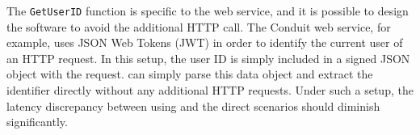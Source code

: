 The \lstinline{GetUserID} function is specific to the web service, and it is possible to design the software to avoid the additional HTTP call. The Conduit web service, for example, uses JSON Web Tokens (JWT) in order to identify the current user of an HTTP request. In this setup, the user ID is simply included in a signed JSON object with the request. \sys{} can simply parse this data object and extract the identifier directly without any additional HTTP requests. Under such a setup, the latency discrepancy between using \sys{} and the direct scenarios should diminish significantly.




